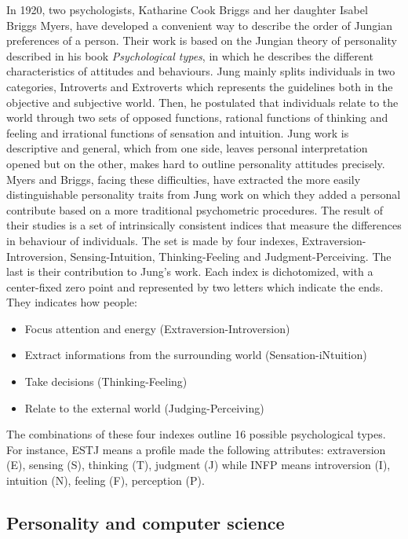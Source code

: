 \documentclass[b5paper,10pt,twoside,cucitura]{toptesi}
\begin{document}
In 1920, two psychologists, Katharine Cook Briggs and her daughter Isabel Briggs Myers, have developed a convenient way to describe the order of Jungian preferences of a person. Their work is based on the Jungian theory of personality described in his book \textit{Psychological types}, in which he describes the different characteristics of attitudes and behaviours. Jung mainly splits individuals in two categories, Introverts and Extroverts which represents the guidelines both in the objective and subjective world. Then, he postulated that individuals relate to the world through two sets of opposed functions, rational functions of thinking and feeling and irrational functions of sensation and intuition. Jung work is descriptive and general, which from one side, leaves personal interpretation opened but on the other, makes hard to outline personality attitudes precisely. Myers and Briggs, facing these difficulties, have extracted the more easily distinguishable personality traits from Jung work on which they added a personal contribute based on a more traditional psychometric procedures. The result of their studies is a set of intrinsically consistent indices that measure the differences in behaviour of individuals. The set is made by four indexes, Extraversion-Introversion, Sensing-Intuition, Thinking-Feeling and Judgment-Perceiving. The last is their contribution to Jung's work. Each index is dichotomized, with a center-fixed zero point and represented by two letters which indicate the ends. They indicates how people:

\begin{itemize}
    \item Focus attention and energy (Extraversion-Introversion)
    \item Extract informations from the surrounding world (Sensation-iNtuition)
    \item Take decisions (Thinking-Feeling)
    \item Relate to the external world (Judging-Perceiving)
\end{itemize}

The combinations of these four indexes outline 16 possible psychological types. For instance, ESTJ means a profile made the following attributes: extraversion (E), sensing (S), thinking (T), judgment (J) while INFP means introversion (I), intuition (N), feeling (F), perception (P). 

\subsection{Personality and computer science}
\end{document}

